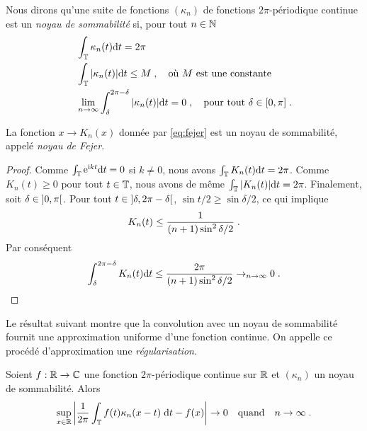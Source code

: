 \begin{definition}
  Nous dirons qu'une suite de fonctions $(\kappa_n)$ de fonctions
  $2\pi$-p\'{e}riodique continue est un \emph{noyau de sommabilit\'{e}} si, pour tout
  $n \in \mathbb{N}$
\begin{align}
\label{eq:kernel:normalisation}
& \int_{\mathbb{T}} \kappa_n(t) \mathrm{d} t = 2 \pi \\
\label{eq:kernel:norme-L1}
& \int_{\mathbb{T}} | \kappa_n(t) | \mathrm{d} t \leq M \;, \quad \text{o\`{u} $M$ est une constante} \\
\label{eq:kernel:negligeable}
& \lim_{n \to \infty} \int_{\delta}^{2 \pi - \delta} |\kappa_n(t)| \mathrm{d} t = 0 \;, \quad \text{pour tout $\delta \in \left[0,\pi\right]$} \;.
\end{align}
\end{definition}
\begin{lemma}
\label{lem:fejer}
La fonction $x \to K_n(x)$ donn\'{e}e par \eqref{eq:fejer} est un noyau de sommabilit\'{e}, appel\'{e} \emph{noyau de Fejer}.
\end{lemma}
\begin{proof}
Comme $\int_{\mathbb{T}} \mathrm{e}^{\mathrm{i} k t} \mathrm{d} t= 0$ si $k \ne 0$, nous avons $\int_{\mathbb{T}} K_n(t) \mathrm{d} t= 2 \pi$.
Comme $K_n(t) \geq 0$ pour tout $t \in \mathbb{T}$, nous avons de m\^{e}me $\int_{\mathbb{T}} |K_n(t)| \mathrm{d} t = 2 \pi$.
Finalement, soit $\delta \in \left]0,\pi\right[ $. Pour tout $t \in \left]\delta,2\pi - \delta\right[$, $\sin t/2 \geq \sin \delta/2$,
ce qui implique
\[
K_n(t) \leq \frac{1}{(n+1) \sin^2 \delta/2} \;.
\]
Par cons\'{e}quent
\[
\int_{\delta}^{2 \pi - \delta} K_n(t) \mathrm{d} t \leq \frac{2 \pi}{(n+1) \sin^2 \delta/2} \to_{n \to \infty} 0 \;.
\]

\end{proof}
Le r\'{e}sultat suivant montre que la convolution avec un noyau de sommabilit\'{e}
fournit une approximation uniforme d'une fonction continue. On appelle ce
proc\'{e}d\'{e} d'approximation une \emph{r\'{e}gularisation}.
\begin{lemma}
\label{lem:approxLinfini-convol-noyau}
Soient $f: \mathbb{R} \to \mathbb{C}$ une fonction $2\pi$-p\'{e}riodique continue sur $\mathbb{R}$
et  $(\kappa_n)$ un noyau de sommabilit\'{e}. Alors
$$
\sup_{x\in\mathbb{R}}
\left|\frac{1}{2 \pi} \int_{\mathbb{T}} f(t) \kappa_n(x-t)\;  \mathrm{d} t - f(x)\right| \to 0
\quad\text{quand}\quad n\to\infty\;.
$$
\end{lemma}
